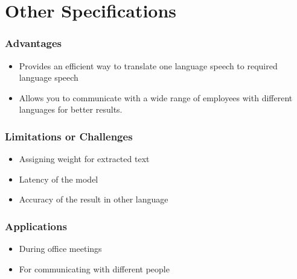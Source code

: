 \clearpage
\chapter{Other Specifications}
\clearpage
\subsection{Advantages}
\begin{itemize}
    \item Provides an efficient way to translate one language speech to required language speech
    \item Allows you to communicate with a wide range of employees with different languages for better results. \\
\end{itemize}

\subsection{Limitations or Challenges}
\begin{itemize}
    \item Assigning weight for extracted text 
    \item Latency of the model
    \item Accuracy of the result in other language \\
\end{itemize}


\subsection{Applications}
\begin{itemize}
    \item During office meetings
    \item For communicating with different people \\
\end{itemize}